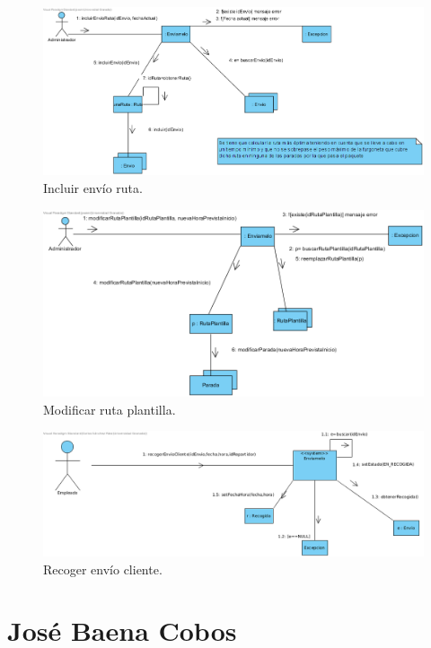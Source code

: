 \documentclass[12pt,spanish]{article}
\begin{document}
\begin{figure}[H]
\centering
\includegraphics[scale=0.5]{incluirEnvioRuta.png}
\caption{Incluir envío ruta.}
\end{figure}


\begin{figure}[H]
\centering
\includegraphics[scale=0.5]{modificarRutaPlantilla.png}
\caption{Modificar ruta plantilla.}
\end{figure}


\begin{figure}[H]
\centering
\includegraphics[scale=0.5]{recogerEnvioCliente.png}
\caption{Recoger envío cliente.}
\end{figure}


\section{José Baena Cobos}
\end{document}
